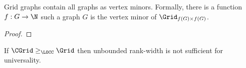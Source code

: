 \begin{theorem}
Grid graphs contain all graphs as vertex minors. Formally, there is a function $f: G \to \N$ such a graph $G$ is the vertex minor of $\Grid_{f(G) \times f(G)}$.
\begin{proof}
\end{proof}
\end{theorem}

\begin{theorem}
If $\CGrid \geq_\LOCC \Grid$ then unbounded rank-width is not sufficient for universality.
\end{theorem}